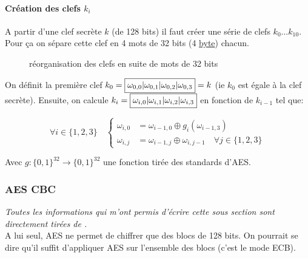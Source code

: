 \documentclass[a4paper, 12pt]{article}
\begin{document}
\paragraph{Création des clefs $k_i$}\label{clefki}
A partir d'une clef secrète $k$ (de 128 bits) il faut créer une série de clefs $k_0\dots k_{10}$.
Pour ça on sépare cette clef en 4 mots de 32 bits (4 \hyperref[byte]{byte}) chacun.

\begin{figure}[h]
\centering
{}
\caption{réorganisation des clefs en suite de mots de 32 bits}
\label{illu_clef}
\end{figure}
On définit la première clef $k_0 = \fbox{$\omega_{0,0}|\omega_{0,1}|\omega_{0,2}|\omega_{0,3}$} = k$ (ie $k_0$ est égale à la clef secrète). Ensuite, on calcule $k_i = \fbox{$\omega_{i,0}|\omega_{i,1}|\omega_{i,2}|\omega_{i,3}$}$ en fonction de $k_{i-1}$ tel que:

$$
\forall i \in \{1,2,3\} \quad 
\begin{cases}
	\omega_{i,0} &= \omega_{i-1,0} \oplus g_i(\omega_{i-1,3}) \\
	\omega_{i,j} &= \omega_{i-1,j} \oplus \omega_{i,j-1} \quad \forall j \in \{1,2,3\} 
\end{cases}
$$

\noindent Avec $g: \{0,1\}^{32} \rightarrow \{0,1\}^{32}$ une fonction tirée des standards d'AES.

\subsubsection{AES CBC}\label{sectioncbc}
\noindent\emph{Toutes les informations qui m'ont permis d'écrire cette sous section sont directement tirées de \cite{courscourt}.}\\

A lui seul, AES ne permet de chiffrer que des blocs de 128 bits. On pourrait se dire qu'il suffit d'appliquer AES sur l'ensemble des blocs (c'est le mode ECB). 
\end{document}
